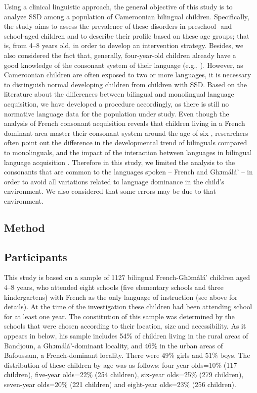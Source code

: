 \documentclass[output=paper,newtxmath,modfonts,nonflat,draftmode]{langsci/langscibook}
\begin{document}
Using a clinical linguistic approach, the general objective of this study is to analyze SSD among a population of Cameroonian bilingual children. Specifically, the study aims to assess the prevalence of these disorders in preschool- and school-aged children and to describe their profile based on these age groups; that is, from 4--8 years old, in order to develop an intervention strategy. Besides, we also considered the fact that, generally, four-year-old children already have a good knowledge of the consonant system of their language (e.g., \citealt{MacLeodEtAl2011}). However, as Cameroonian children are often exposed to two or more languages, it is necessary to distinguish normal developing children from children with SSD. Based on the literature about the differences between bilingual and monolingual language acquisition, we have developed a procedure accordingly, as there is still no normative language data for the population under study. Even though the analysis of French consonant acquisition reveals that children living in a French dominant area master their consonant system around the age of six \cite{Rvachew2013}, researchers often point out the difference in the developmental trend of bilinguals compared to monolinguals, and the impact of the interaction between languages in bilingual language acquisition \cite{Paradis2011}. Therefore in this study, we limited the analysis to the consonants that are common to the languages spoken – French and Ghɔmálá’ – in order to avoid all variations related to language dominance in the child’s environment. We also considered that some errors may be due to that environment. 

\subsection{Method} %

\subsection{Participants}

This study is based on a sample of 1127 bilingual French-Ghɔmálá’ children aged 4--8 years, who attended eight schools (five elementary schools and three kindergartens) with French as the only language of instruction (see  above for details). At the time of the investigation these children had been attending school for at least one year. The constitution of this sample was determined by the schools that were chosen according to their location, size and accessibility. As it appears in  below, his sample includes 54\% of children living in the rural areas of Bandjoun, a Ghɔmálá’-dominant locality, and 46\% in the urban areas of Bafoussam, a French-dominant locality. There were 49\% girls and 51\% boys. The distribution of these children by age was as follows: four-year-olds=10\% (117 children), five-year olds=22\% (254 children), six-year olds=25\% (279 children), seven-year olds=20\% (221 children) and eight-year olds=23\% (256 children).
\end{document}
